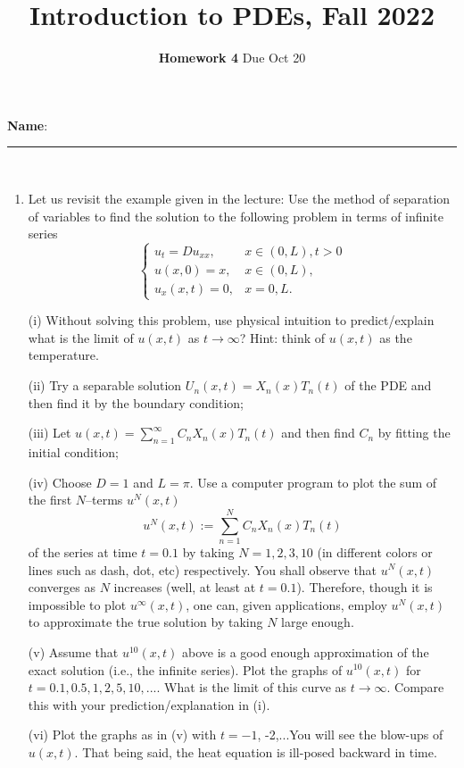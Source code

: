 \documentclass[6pt]{article}
\title{Introduction to PDEs, Fall 2022}
\author{\textbf{Homework 4} Due Oct 20}
\date{}
\numberwithin{equation}{section}
\begin{document}
\maketitle

\textbf{Name}:\rule{1 in}{0.001 in} \\
\begin{enumerate}
 


\item  Let us revisit the example given in the lecture: Use the method of separation of variables to find the solution to the following problem in terms of infinite series
\begin{equation}
\left\{
\begin{array}{ll}
u_t=Du_{xx},& x\in (0,L), t>0\\
u(x,0)=x, &x\in(0,L), \\
u_x(x,t)=0, & x=0,L.
\end{array}
\right.
\end{equation}

(i) Without solving this problem, use physical intuition to predict/explain what is the limit of $u(x,t)$ as $t\rightarrow \infty$?  Hint: think of $u(x,t)$ as the temperature.

(ii)  Try a separable solution $U_n(x,t)=X_n(x)T_n(t)$ of the PDE and then find it by the boundary condition;

(iii)  Let $u(x,t)=\sum^\infty_{n=1}C_nX_n(x)T_n(t)$ and then find $C_n$ by fitting the initial condition;

(iv)  Choose $D=1$ and $L=\pi$.  Use a computer program to plot the sum of the first $N$--terms $u^N(x,t)$
\[u^N(x,t):=\sum^N_{n=1}C_nX_n(x)T_n(t)\]
of the series at time $t=0.1$ by taking $N=1, 2, 3, 10$ (in different colors or lines such as dash, dot, etc) respectively.  You shall observe that $u^N(x,t)$ converges as $N$ increases (well, at least at $t=0.1$).  Therefore, though it is impossible to plot $u^\infty(x,t)$, one can, given applications, employ $u^N(x,t)$ to approximate the true solution by taking $N$ large enough.

(v)  Assume that $u^{10}(x,t)$ above is a good enough approximation of the exact solution (i.e., the infinite series).  Plot the graphs of $u^{10}(x,t)$ for $t=0.1,0.5,1,2,5,10,...$. What is the limit of this curve as $t\rightarrow \infty$.  Compare this with your prediction/explanation in (i).

(vi) Plot the graphs as in (v) with $t=-1$, -2,...You will see the blow-ups of $u(x,t)$.   That being said, the heat equation is ill-posed backward in time.



\end{enumerate}
\end{document}
